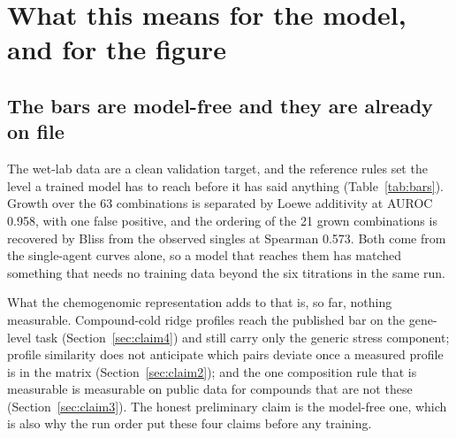 
\section{What this means for the model, and for the figure}
\label{sec:model}

\subsection{The bars are model-free and they are already on file}
\label{sec:bars}

The wet-lab data are a clean validation target, and the reference rules set the level a
trained model has to reach before it has said anything (Table~\ref{tab:bars}). Growth
over the 63 combinations is separated by Loewe additivity at AUROC 0.958, with one false
positive, and the ordering of the 21 grown combinations is recovered by Bliss from the
observed singles at Spearman 0.573. Both come from the single-agent curves alone, so a
model that reaches them has matched something that needs no training data beyond the six
titrations in the same run.

\begin{table}[htbp]
\centering
\footnotesize
\caption[]{The bars a dose- and mixture-aware model has to clear on these data, served
call, taken from the best reference rule for each test. The two growth rows and the two
fitness rows differ only in whether the six single-agent combinations are included, and
the fitness rows are the harder test: 15 grown combinations of two or more inhibitors is
a small sample and Bliss already orders them at 0.261.}
\label{tab:bars}

\end{table}

What the chemogenomic representation adds to that is, so far, nothing measurable.
Compound-cold ridge profiles reach the published bar on the gene-level task
(Section~\ref{sec:claim4}) and still carry only the generic stress component; profile
similarity does not anticipate which pairs deviate once a measured profile is in the
matrix (Section~\ref{sec:claim2}); and the one composition rule that is measurable is
measurable on public data for compounds that are not these
(Section~\ref{sec:claim3}). The honest preliminary claim is the model-free one, which is
also why the run order put these four claims before any training.

